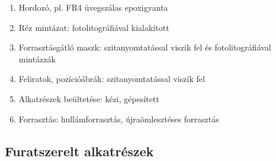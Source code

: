 \documentclass[11pt]{article}
\begin{document}
\begin{figure}[!htb]
				\hspace{\fill}
				\hspace{\fill}
			\end{figure}

			\begin{enumerate}[a]
				\item Hordozó, pl. FR4 üvegszálas epoxigyanta
				\item Réz mintázat: fotolitográfiával kialakított
				\item Forrasztásgátló maszk: szitanyomtatással viszik fel és fotolitográfiával mintázzák
				\item Feliratok, pozícióábrák: szitanyomtatással viszik fel
				\item Alkatrészek beültetése: kézi, gépesített
				\item Forrasztás: hullámforrasztás, újraömlesztéses forrasztás
			\end{enumerate}

		\subsection{Furatszerelt alkatrészek}
\end{document}
